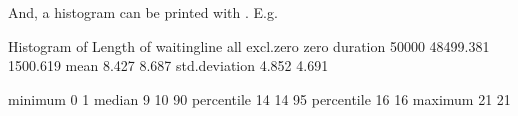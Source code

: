\documentclass[letterpaper,10pt,english]{sphinxmanual}
\begin{document}
And, a histogram can be printed with . E.g.

\begin{sphinxVerbatim}[commandchars=\\\{\}]
  
\end{sphinxVerbatim}

\begin{sphinxVerbatim}[commandchars=\\\{\}]
Histogram of Length of waitingline
                        all    excl.zero         zero
\PYGZhy{}\PYGZhy{}\PYGZhy{}\PYGZhy{}\PYGZhy{}\PYGZhy{}\PYGZhy{}\PYGZhy{}\PYGZhy{}\PYGZhy{}\PYGZhy{}\PYGZhy{}\PYGZhy{}\PYGZhy{} \PYGZhy{}\PYGZhy{}\PYGZhy{}\PYGZhy{}\PYGZhy{}\PYGZhy{}\PYGZhy{}\PYGZhy{}\PYGZhy{}\PYGZhy{}\PYGZhy{}\PYGZhy{} \PYGZhy{}\PYGZhy{}\PYGZhy{}\PYGZhy{}\PYGZhy{}\PYGZhy{}\PYGZhy{}\PYGZhy{}\PYGZhy{}\PYGZhy{}\PYGZhy{}\PYGZhy{} \PYGZhy{}\PYGZhy{}\PYGZhy{}\PYGZhy{}\PYGZhy{}\PYGZhy{}\PYGZhy{}\PYGZhy{}\PYGZhy{}\PYGZhy{}\PYGZhy{}\PYGZhy{}
duration          50000        48499.381     1500.619
mean                  8.427        8.687
std.deviation         4.852        4.691

minimum               0            1
median                9           10
90\PYGZpc{} percentile       14           14
95\PYGZpc{} percentile       16           16
maximum              21           21


\end{sphinxVerbatim}
\end{document}
